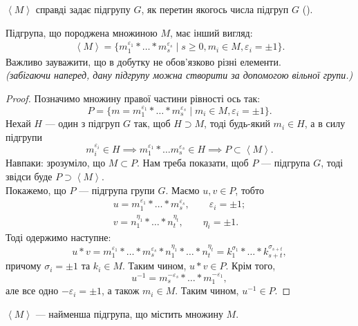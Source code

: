 \documentclass{math_library}
\begin{document}
\begin{remark}
$\left<M\right>$ справді задає підгрупу $G$, як перетин якогось числа підгруп $G$ ().
\end{remark}

\begin{proposition}
Підгрупа, що породжена множиною $M$, має інший вигляд:
\begin{align*}
\left<M\right> = \{ m_1^{\varepsilon_1} * \dots * m_s^{\varepsilon_s} \mid s \geq 0, m_i \in M, \varepsilon_i = \pm 1 \}.
\end{align*}
Важливо зауважити, що в добутку не обов'язково різні елементи.\\
\textit{(забігаючи наперед, дану підгрупу можна створити за допомогою вільної групи.)}
\end{proposition}

\begin{proof}
Позначимо множину правої частини рівності ось так:
\[ 
P = \{ m = m_1^{\varepsilon_1} * \dots * m_s^{\varepsilon_s} \mid m_i \in M, \varepsilon_i = \pm 1 \}.
\]
Нехай $H$ --- один з підгруп $G$ так, щоб $H \supset M$, тоді будь-який $m_i \in H$, а в силу підгрупи 
\[
m_i^{\varepsilon_i} \in H \implies m_1^{\varepsilon_1} * \dots m_s^{\varepsilon_s} \in H \implies P \subset \left<M\right>.
\]
Навпаки: зрозуміло, що $M \subset P$. Нам треба показати, щоб $P$ --- підгрупа $G$, тоді звідси буде $P \supset \left<M\right>$.
\bigskip \\
Покажемо, що $P$ --- підгрупа групи $G$. Маємо $u,v \in P$, тобто
\begin{align*}
u = m_1^{\varepsilon_1} * \dots * m_s^{\varepsilon_s}, \qquad \varepsilon_i = \pm 1; \\
v = n_1^{\eta_1} * \dots * n_t^{\eta_t}, \qquad \eta_i = \pm 1.
\end{align*}
Тоді одержимо наступне:
\[
u*v = m_1^{\varepsilon_1} * \dots * m_s^{\varepsilon_s} * n_1^{\eta_1} * \dots * n_t^{\eta_t} = k_1^{\sigma_1} * \dots * k_{s+t}^{\sigma_{s+t}},
\]
причому $\sigma_i = \pm 1$ та $k_i \in M$. Таким чином, $u*v \in P$. Крім того,
\[
u^{-1} = m_s^{-\varepsilon_s} * \dots * m_1^{-\varepsilon_1},
\]
але все одно $-\varepsilon_i = \pm 1$, а також $m_i \in M$. Таким чином, $u^{-1} \in P$.
\end{proof}

\begin{remark}
$\left<M\right>$ --- найменша підгрупа, що містить множину $M$.
\end{remark}
\end{document}
